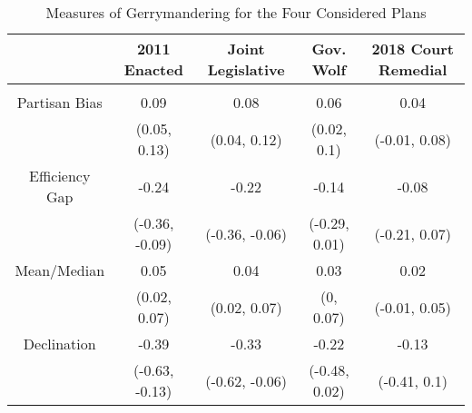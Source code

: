 %
\begin{table}[!htbp] \centering 
  \caption{Measures of Gerrymandering for the Four Considered Plans} 
  \label{tab:gerry} 
\begin{tabular}{@{\extracolsep{-5pt}} ccccc} 
 & 2011 Enacted & Joint Legislative & Gov. Wolf & 2018 Court Remedial \\ 
\hline \\[-1.8ex] 
Partisan Bias & 0.09 & 0.08 & 0.06 & 0.04 \\ 
 & (0.05, 0.13) & (0.04, 0.12) & (0.02, 0.1) & (-0.01, 0.08) \\ 
Efficiency Gap & -0.24 & -0.22 & -0.14 & -0.08 \\ 
 & (-0.36, -0.09) & (-0.36, -0.06) & (-0.29, 0.01) & (-0.21, 0.07) \\ 
Mean/Median & 0.05 & 0.04 & 0.03 & 0.02 \\ 
 & (0.02, 0.07) & (0.02, 0.07) & (0, 0.07) & (-0.01, 0.05) \\ 
Declination & -0.39 & -0.33 & -0.22 & -0.13 \\ 
 & (-0.63, -0.13) & (-0.62, -0.06) & (-0.48, 0.02) & (-0.41, 0.1) \\ 
\end{tabular}
\end{table} 
%
